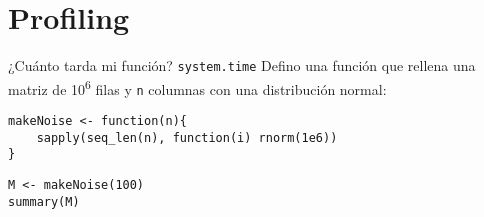 \documentclass[xcolor={usenames,svgnames,dvipsnames}]{beamer}
\begin{document}
\section{Profiling}
\label{sec:org0dfd80d}
\begin{frame}[label={sec:org4ea8038},fragile]{¿Cuánto tarda mi función? \texttt{system.time}}
 Defino una función que rellena una matriz de 10\textsuperscript{6} filas y \texttt{n} columnas con una distribución normal:
\lstset{language=r,label= ,caption= ,captionpos=b,numbers=none}
\begin{lstlisting}
makeNoise <- function(n){
    sapply(seq_len(n), function(i) rnorm(1e6))
}
\end{lstlisting}

\lstset{language=r,label= ,caption= ,captionpos=b,numbers=none}
\begin{lstlisting}
M <- makeNoise(100)
summary(M)
\end{lstlisting}

\begin{verbatim}


\end{verbatim}
\end{frame}
\end{document}
